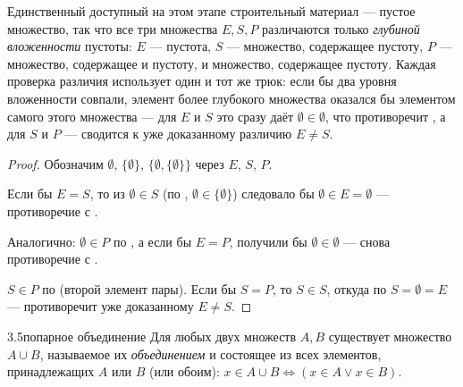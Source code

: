 \begin{intuition}
Единственный доступный на этом этапе строительный материал — пустое множество, так что все
три множества $E,S,P$ различаются только \emph{глубиной вложенности} пустоты: $E$ — пустота,
$S$ — множество, содержащее пустоту, $P$ — множество, содержащее и пустоту, и множество,
содержащее пустоту. Каждая проверка различия использует один и тот же трюк: если бы два
уровня вложенности совпали, элемент более глубокого множества оказался бы элементом самого
этого множества — для $E$ и $S$ это сразу даёт $\emptyset \in \emptyset$, что противоречит
, а для $S$ и $P$ — сводится к уже доказанному
различию $E \neq S$.
\end{intuition}

\begin{proof}
Обозначим $\emptyset$, $\{\emptyset\}$, $\{\emptyset,\{\emptyset\}\}$ через $E$, $S$, $P$.

 Если бы $E=S$, то из $\emptyset \in S$ (по
, $\emptyset \in \{\emptyset\}$) следовало бы
$\emptyset \in E = \emptyset$ — противоречие с .

 Аналогично: $\emptyset \in P$ по , а
если бы $E=P$, получили бы $\emptyset \in \emptyset$ — снова противоречие с
.

 $S \in P$ по  (второй элемент пары).
Если бы $S=P$, то $S \in S$, откуда по  $S=\emptyset=E$ —
противоречит уже доказанному $E \neq S$.
\end{proof}

\begin{axiom}{3.5}{попарное объединение}
Для любых двух множеств $A,B$ существует множество $A \cup B$, называемое их
\emph{объединением} и состоящее из всех элементов, принадлежащих $A$ или $B$ (или обоим):
$x \in A \cup B \iff (x \in A \lor x \in B)$.
\end{axiom}

